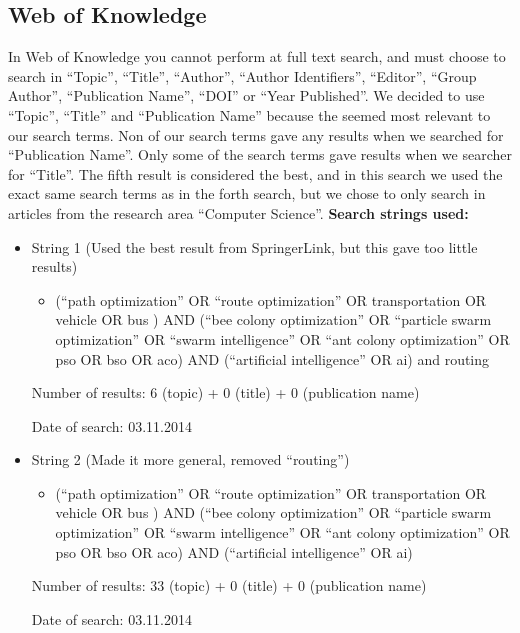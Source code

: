 \subsection{Web of Knowledge}
In Web of Knowledge you cannot perform at full text search, and must choose to search in “Topic”, “Title”, “Author”, “Author Identifiers”, “Editor”, “Group Author”, “Publication Name”, “DOI” or “Year Published”. We decided to use “Topic”, “Title” and “Publication Name” because the seemed most relevant to our search terms. Non of our search terms gave any results when we searched for “Publication Name”. Only some of the search terms gave results when we searcher for “Title”. The fifth result is considered the best, and in this search we used the exact same search terms as in the forth search, but we chose to only search in articles from the research area “Computer Science”. 
\newline
\textbf{Search strings used:}
\begin{itemize}
\item String 1 (Used the best result from SpringerLink, but this gave too little results)
\begin{itemize}
\item (``path optimization'' OR ``route optimization'' OR transportation OR vehicle OR bus ) AND (``bee colony optimization'' OR ``particle swarm optimization'' OR ``swarm intelligence'' OR ``ant colony optimization'' OR pso OR bso OR aco) AND (``artificial intelligence'' OR ai) and routing
\end{itemize}
\par
Number of results: 6 (topic) + 0 (title) + 0 (publication name)
\par
Date of search: 03.11.2014
\end{itemize}
\begin{itemize}
\item String 2 (Made it more general, removed ``routing'')
\begin{itemize}
\item (``path optimization'' OR ``route optimization'' OR transportation OR vehicle OR bus ) AND (``bee colony optimization'' OR ``particle swarm optimization'' OR ``swarm intelligence'' OR ``ant colony optimization'' OR pso OR bso OR aco) AND (``artificial intelligence'' OR ai)
\end{itemize}
\par
Number of results: 33 (topic) + 0 (title) + 0 (publication name)
\par
Date of search: 03.11.2014
\end{itemize}
